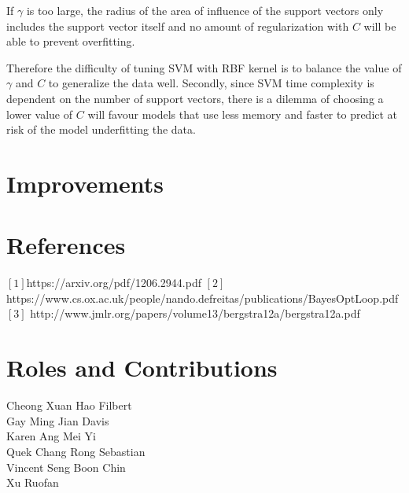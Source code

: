 \documentclass[letterpaper]{article}
\begin{document}
If $\gamma$ is too large, the radius of the area of influence of the support vectors only
includes the support vector itself and no amount of regularization with $\textit{C}$ will be
able to prevent overfitting.

Therefore the difficulty of tuning SVM with RBF kernel is to balance the value of
$\gamma$ and $\textit{C}$ to generalize the data well. Secondly, since SVM time complexity
is dependent on the number of support vectors, there is a dilemma of choosing a lower value
of $\textit{C}$ will favour models that use less memory and faster to predict at risk of
the model underfitting the data.

\section{Improvements}

\section{References}
$[1]$https://arxiv.org/pdf/1206.2944.pdf  
$[2]$https://www.cs.ox.ac.uk/people/nando.defreitas/publications/BayesOptLoop.pdf  
$[3]$ http://www.jmlr.org/papers/volume13/bergstra12a/bergstra12a.pdf

\section{Roles and Contributions}

\begin{description}
\item [Cheong Xuan Hao Filbert]
\item [Gay Ming Jian Davis]
\item [Karen Ang Mei Yi]
\item [Quek Chang Rong Sebastian]
\item [Vincent Seng Boon Chin]
\item [Xu Ruofan]
\end{description}
\end{document}
